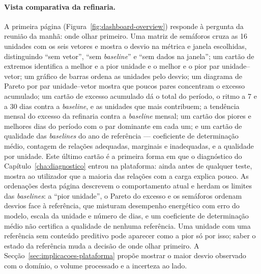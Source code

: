 \paragraph{Vista comparativa da refinaria.} A primeira página
(Figura~\ref{fig:dashboard-overview}) responde à
pergunta da reunião da manhã: onde olhar primeiro. Uma matriz de
semáforos cruza as 16 unidades com os seis vetores e mostra o desvio na
métrica e janela escolhidas, distinguindo ``sem vetor'', ``sem
\emph{baseline}'' e ``sem dados na janela''; um cartão de extremos
identifica a melhor e a pior unidade e o melhor e o pior par
unidade--vetor; um gráfico de barras ordena as unidades pelo desvio; um
diagrama de Pareto por par unidade--vetor mostra que poucos pares
concentram o excesso acumulado; um cartão de excesso acumulado dá o total
do período, o ritmo a 7 e a 30 dias contra a \emph{baseline}, e as unidades
que mais contribuem; a tendência mensal do excesso da refinaria contra a
\emph{baseline} mensal; um cartão dos piores e melhores dias do período
com o par dominante em cada um; e um cartão de qualidade das
\emph{baselines} do ano de referência --- coeficiente de determinação
médio, contagem de relações adequadas, marginais e inadequadas, e a
qualidade por unidade. Este último cartão é a primeira forma em que o
diagnóstico do Capítulo~\ref{cha:diagnostico} entrou na plataforma: ainda
antes de qualquer teste, mostra ao utilizador que a maioria das relações
com a carga explica pouco. As ordenações desta página descrevem o
comportamento atual e herdam os limites das \emph{baselines}: a ``pior
unidade'', o Pareto do excesso e os semáforos ordenam desvios face à
referência, que misturam desempenho energético com erro do modelo, escala
da unidade e número de dias, e um coeficiente de determinação médio não
certifica a qualidade de nenhuma referência. Uma unidade com uma referência
sem conteúdo preditivo pode aparecer como a pior só por isso; saber o
estado da referência muda a decisão de onde olhar primeiro. A
Secção~\ref{sec:implicacoes-plataforma} propõe mostrar o maior desvio
observado com o domínio, o volume processado e a incerteza ao lado.


